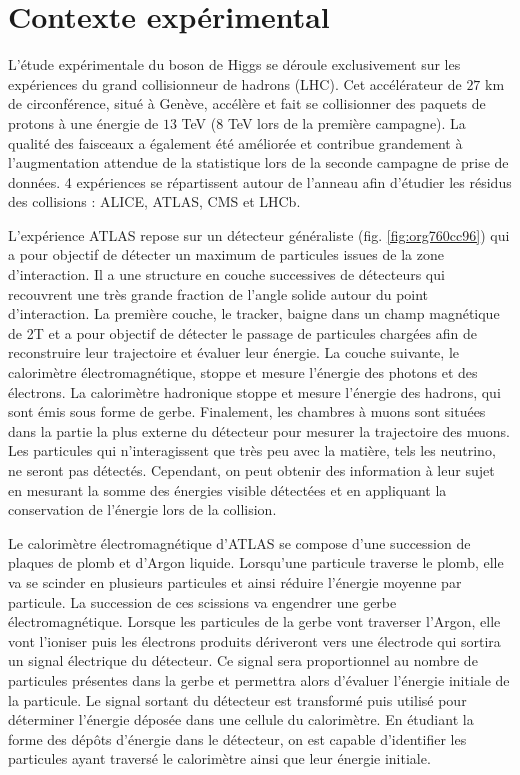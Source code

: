 \section{Contexte expérimental}

L'étude expérimentale du boson de Higgs se déroule exclusivement sur les expériences du grand collisionneur de hadrons (LHC).
Cet accélérateur de $27$ km de circonférence, situé à Genève, accélère et fait se collisionner des paquets de protons à une énergie de $13$ TeV ($8$ TeV lors de la première campagne).
La qualité des faisceaux a également été améliorée et contribue grandement à l'augmentation attendue de la statistique lors de la seconde campagne de prise de données.
4 expériences se répartissent autour de l'anneau afin d'étudier les résidus des collisions : ALICE, ATLAS, CMS et LHCb.

L'expérience ATLAS repose sur un détecteur généraliste (fig. \ref{fig:org760cc96}) qui a pour objectif de détecter un maximum de particules issues de la zone d'interaction.
Il a une structure en couche successives de détecteurs qui recouvrent une très grande fraction de l'angle solide autour du point d'interaction.
La première couche, le tracker, baigne dans un champ magnétique de 2T et a pour objectif de détecter le passage de particules chargées afin de reconstruire leur trajectoire et évaluer leur énergie.
La couche suivante, le calorimètre électromagnétique, stoppe et mesure l'énergie des photons et des électrons.
La calorimètre hadronique stoppe et mesure l'énergie des hadrons, qui sont émis sous forme de gerbe.
Finalement, les chambres à muons sont situées dans la partie la plus externe du détecteur pour mesurer la trajectoire des muons.
Les particules qui n'interagissent que très peu avec la matière, tels les neutrino, ne seront pas détectés.
Cependant, on peut obtenir des information à leur sujet en mesurant la somme des énergies visible détectées et en appliquant la conservation de l'énergie lors de la collision.

Le calorimètre électromagnétique d'ATLAS se compose d'une succession de plaques de plomb et d'Argon liquide.
Lorsqu'une particule traverse le plomb, elle va se scinder en plusieurs particules et ainsi réduire l'énergie moyenne par particule.
La succession de ces scissions va engendrer une gerbe électromagnétique.
Lorsque les particules de la gerbe vont traverser l'Argon, elle vont l'ioniser puis les électrons produits dériveront vers une électrode qui sortira un signal électrique du détecteur.
Ce signal sera proportionnel au nombre de particules présentes dans la gerbe et permettra alors d'évaluer l'énergie initiale de la particule.
Le signal sortant du détecteur est transformé puis utilisé pour déterminer l'énergie déposée dans une cellule du calorimètre.
En étudiant la forme des dépôts d'énergie dans le détecteur, on est capable d'identifier les particules ayant traversé le calorimètre ainsi que leur énergie initiale.


